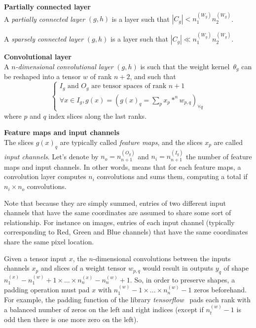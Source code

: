\begin{definition}\textbf{Partially connected layer}\\
A \emph{partially connected layer} $(g,h)$ is a layer such that $|C_g| < n_1^{(W_g)} n_2^{(W_g)}$.

A \emph{sparsely connected layer} $(g,h)$ is a layer such that $|C_g| \ll n_1^{(W_g)} n_2^{(W_g)}$.
\end{definition}

\begin{definition}\textbf{Convolutional layer}\\
A \emph{$n$-dimensional convolutional layer} $(g,h)$ is such that the weight kernel~$\theta_g$ can be reshaped into a tensor $w$ of rank $n+2$, and such that
$$
\left\{
\begin{array}{l}
  I_g \mbox{ and } O_g \mbox{ are tensor spaces of rank }n+1 \\
  \forall x \in I_g, g(x) = (g(x)_q = \sum\limits_p{x_p \ast^n w_{p,q}})_{\forall q}
\end{array}
\right.
$$
where $p$ and $q$ index slices along the last ranks.
\label{def:convlayer}
\end{definition}

\begin{definition}\textbf{Feature maps and input channels}\\
The slices $g(x)_q$ are typically called \textit{feature maps}, and the slices $x_p$ are called \textit{input channels}. Let's denote by $n_o = n_{n+1}^{(O_g)}$ and $n_i =n_{n+1}^{(I_g)}$ the number of feature maps and input channels.
In other words,  means that for each feature maps, a convolution layer computes $n_i$ convolutions and sums them, computing a total if $n_i \times n_o$ convolutions.
\end{definition}

\begin{remark}
Note that because they are simply summed, entries of two different input channels that have the same coordinates are assumed to share some sort of relationship. For instance on images, entries of each input channel (typically corresponding to Red, Green and Blue channels) that have the same coordinates share the same pixel location.
\end{remark}

\begin{remark}
Given a tensor input $x$, the $n$-dimensional convolutions between the inputs channels $x_p$ and slices of a weight tensor $w_{p,q}$ would result in outputs $y_q$ of shape $n_1^{(x)} - n_1^{(w)} + 1 \times \ldots \times n_n^{(x)} - n_n^{(w)} + 1$. So, in order to preserve shapes, a padding operation must pad $x$ with $n_1^{(w)} - 1 \times \ldots \times n_n^{(w)} - 1$ zeros beforehand. For example, the padding function of the library \emph{tensorflow}~\citep{tensorflow2015-whitepaper} pads each rank with a balanced number of zeros on the left and right indices (except if $n_t^{(w)} - 1$ is odd then there is one more zero on the left).
\end{remark}

